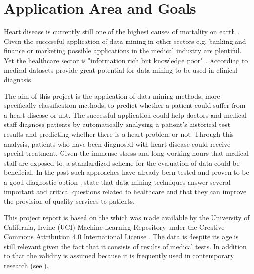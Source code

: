 \section{Application Area and Goals} \label{sec:applicationAreaGoals}

Heart disease is currently still one of the highest causes of mortality on earth \citep{nahar2013, kavitha2016, statistischesbundesamt2020}.
Given the successful application of data mining in other sectors e.g. banking and finance or marketing \citep{keles2017} possible applications in the medical industry are plentiful. Yet the healthcare sector is "information rich but knowledge poor" \citep{soni2011}. According to \citet{soni2011} medical datasets provide great potential for data mining to be used in clinical diagnosis.


The aim of this project is the application of data mining methods, more specifically classification methods, to predict whether a patient could suffer from a heart disease or not. The successful application could help doctors and medical staff diagnose patients by automatically analysing a patient's historical test results and predicting whether there is a heart problem or not. Through this analysis, patients who have been diagnosed with heart disease could receive special treatment. Given the immense stress and long working hours that medical staff are exposed to, a standardized scheme for the evaluation of data could be beneficial. 
In the past such approaches have already been tested and proven to be a good diagnostic option \citep{usharani2011}. \citet{jabbar2013} state that data mining techniques answer several important and critical questions related to healthcare and that they can improve the provision of quality services to patients.

This project report is based on the  \citep{janosi1988} which was made available by the University of California, Irvine (UCI) Machine Learning Repository under the Creative Commons Attribution 4.0 International License \citep{janosi1988}.  The data is despite its age is still relevant given the fact that it consists of results of medical tests. In addition to that the validity is assumed because it is frequently used in contemporary research (see \cite{usharani2011, aha1988, nahar2013}). 